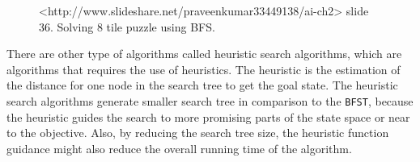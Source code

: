 \iftrue
\begin{landscape}
\begin{figure}[htb]

\resizebox{\dimexpr\linewidth-1cm}{!}{%
\begin{forest}
[\usebox\myboxbfsone
  [\usebox\myboxbfstwo
	[\usebox\myboxbfsfive
		[\usebox\myboxbfsten
			[\usebox\myboxbfstwenty
				[\usebox\myboxbfsthirtyfour]
				[\usebox\myboxbfsthirtyfive]			
			]		
		]
		[\usebox\myboxbfseleven
			[\usebox\myboxbfstwentyone
				[\usebox\myboxbfsthirtysix]
				[\usebox\myboxbfsthirtyseven]			
			]
			[\usebox\myboxbfstwentytwo
				[\usebox\myboxbfsthirtyeight]
				[\usebox\myboxbfsthirtynine]			
			]
			[\usebox\myboxbfstwentythree
				[\usebox\myboxbfsforty]
				[\usebox\myboxbfsfortyone]			
			]		
		]	
	]  
  ]
  [\usebox\myboxbfsthree
	[\usebox\myboxbfssix
		[\usebox\myboxbfstwelve
			[\usebox\myboxbfstwentyfour
				[\usebox\myboxbfsfortytwo]
				[\usebox\myboxbfsfortythree]			
			]		
		]
		[\usebox\myboxbfsthirteen
			[\usebox\myboxbfstwentyfive
				[\usebox\myboxbfsfortyfour]
				[\usebox\myboxbfsfortyfive]			
			]		
		]	
	]
	[\usebox\myboxbfsseven
		[\usebox\myboxbfsfourteen
			[\usebox\myboxbfstwentysix
				[\usebox\myboxbfsfortysix]			
			]		
		]
		[\usebox\myboxbfsfifteen
			[\usebox\myboxbfstwentyseven]		
		]	
	]
	[\usebox\myboxbfseight
		[\usebox\myboxbfssixteen
			[\usebox\myboxbfstwentyeight]		
		]
		[\usebox\myboxbfsseventeen
			[\usebox\myboxbfstwentynine]		
		]	
	]  
  ]
  [\usebox\myboxbfsfour
	[\usebox\myboxbfsnine
		[\usebox\myboxbfseighteen
			[\usebox\myboxbfsthirty]
			[\usebox\myboxbfsthirtyone]
			[\usebox\myboxbfsthirtytwo]
		]
		[\usebox\myboxbfsnineteen
			[\usebox\myboxbfsthirtythree]		
		]
	]  
  ]
]
\end{forest}
}
\caption{<http://www.slideshare.net/praveenkumar33449138/ai-ch2> slide 36. Solving 8 tile puzzle using BFS.} \label{fig:bfs_solution}
\end{figure}
\end{landscape}
\fi

There are other type of algorithms called heuristic search algorithms, which are algorithms that requires the use of heuristics. The heuristic is the estimation of the distance for one node in the search tree to get the goal state. The heuristic search algorithms generate smaller search tree in comparison to the \texttt{BFST}, because the heuristic guides the search to more promising parts of the state space or near to the objective. Also, by reducing the search tree size, the heuristic function guidance might also reduce the overall running time of the algorithm.

